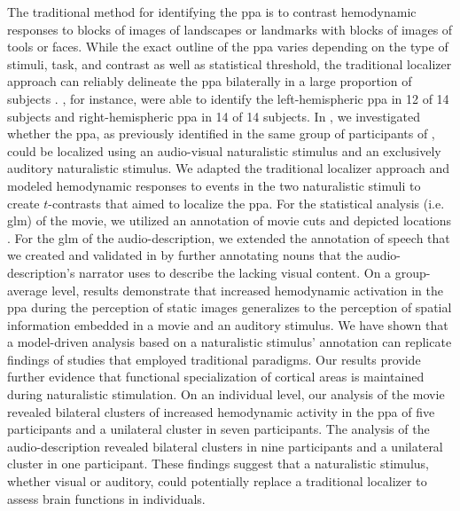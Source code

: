 %
The traditional method for identifying the \ac{ppa} is to contrast hemodynamic
responses to blocks of images of landscapes or landmarks with blocks of images
of tools or faces.
%
While the exact outline of the \ac{ppa} varies depending on the type of stimuli,
task, and contrast as well as statistical threshold, the traditional localizer
approach can reliably delineate the \ac{ppa} bilaterally in a large proportion
of subjects \citep{zhen2017quantifying}.
%
\citet{sengupta2016extension}, for instance, were able to identify the
left-hemispheric \ac{ppa} in 12 of 14 subjects and right-hemispheric \ac{ppa} in
14 of 14 subjects.
In \citet{haeusler2022processing}, we investigated whether the \ac{ppa}, as
previously identified in the same group of participants of
\citet{sengupta2016extension}, could be localized using an audio-visual
naturalistic stimulus and an exclusively auditory naturalistic stimulus.
We adapted the traditional localizer approach and modeled hemodynamic responses
to events in the two naturalistic stimuli to create $t$-contrasts that aimed to
localize the \ac{ppa}.
For the statistical analysis (i.e. \ac{glm}) of the movie, we utilized an
annotation of movie cuts and depicted locations \citep{haeusler2016cutanno}.
For the \ac{glm} of the audio-description, we extended the annotation of speech
that we created and validated in \citet{haeusler2021speechanno} by further
annotating nouns that the audio-description's narrator uses to describe the
lacking visual content.
On a group-average level, results demonstrate that increased hemodynamic
activation in the \ac{ppa} during the perception of static images generalizes to
the perception of spatial information embedded in a movie and an auditory
stimulus.
%
We have shown that a model-driven analysis based on a naturalistic stimulus'
annotation can replicate findings of studies that employed traditional
paradigms.
%
Our results provide further evidence \citep[cf.][]{bartels2004mapping} that
functional specialization of cortical areas is maintained during naturalistic
stimulation.
On an individual level, our analysis of the movie revealed bilateral clusters of
increased hemodynamic activity in the \ac{ppa} of five participants and a
unilateral cluster in seven participants.
%
The analysis of the audio-description revealed bilateral clusters in nine
participants and a unilateral cluster in one participant.
These findings suggest that a naturalistic stimulus, whether visual or auditory,
could potentially replace a traditional localizer to assess brain functions in
individuals.




